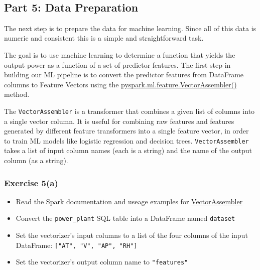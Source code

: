 \documentclass[11pt]{article}
\providecommand{\tightlist}{%
      \setlength{\itemsep}{0pt}\setlength{\parskip}{0pt}}
\begin{document}
    \begin{center}
    \end{center}
    { \hspace*{\fill} \\}
    
    \hypertarget{part-5-data-preparation}{%
\subsection{Part 5: Data Preparation}\label{part-5-data-preparation}}

The next step is to prepare the data for machine learning. Since all of
this data is numeric and consistent this is a simple and straightforward
task.

The goal is to use machine learning to determine a function that yields
the output power as a function of a set of predictor features. The first
step in building our ML pipeline is to convert the predictor features
from DataFrame columns to Feature Vectors using the
\href{https://spark.apache.org/docs/latest/api/python/reference/api/pyspark.ml.feature.VectorAssembler.html?highlight=vectorassembler\#pyspark.ml.feature.VectorAssembler}{pyspark.ml.feature.VectorAssembler()}
method.

The \texttt{VectorAssembler} is a transformer that combines a given list
of columns into a single vector column. It is useful for combining raw
features and features generated by different feature transformers into a
single feature vector, in order to train ML models like logistic
regression and decision trees. \texttt{VectorAssembler} takes a list of
input column names (each is a string) and the name of the output column
(as a string).

\hypertarget{exercise-5a}{%
\subsubsection{Exercise 5(a)}\label{exercise-5a}}

\begin{itemize}
\tightlist
\item
  Read the Spark documentation and useage examples for
  \href{https://spark.apache.org/docs/latest/api/python/reference/api/pyspark.ml.feature.VectorAssembler.html?highlight=vectorassembler\#pyspark.ml.feature.VectorAssembler}{VectorAssembler}
\item
  Convert the \texttt{power\_plant} SQL table into a DataFrame named
  \texttt{dataset}
\item
  Set the vectorizer's input columns to a list of the four columns of
  the input DataFrame: \texttt{{[}"AT",\ "V",\ "AP",\ "RH"{]}}
\item
  Set the vectorizer's output column name to \texttt{"features"}
\end{itemize}
\end{document}
